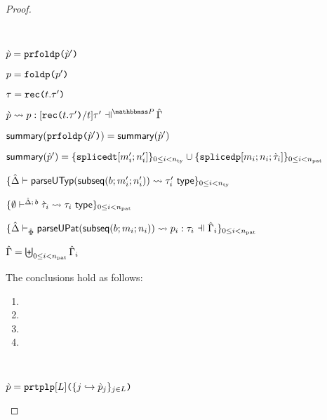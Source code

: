 \begin{grayparbox}
\begin{proof}
\begin{byCases}
    \resetpfcounter
  \item[\text{(\ref{rule:cvalidP-UP-fold})}] ~
    \begin{pfsteps*}
      \item $\grave{p}=\texttt{prfoldp}\texttt{(}\grave{p}'\texttt{)}$ 
      \item $p=\texttt{foldp}\texttt{(}p'\texttt{)}$ 
      \item $\tau=\texttt{rec}\texttt{(}t.\tau'\texttt{)}$ 
      \item $\cvalidP{\upctx}{\pscenev}{\cpv}{p}{[\arec{t}{\tau'}/t]\tau'}$  
      \item $\mathsf{summary}(\texttt{prfoldp}\texttt{(}\grave{p}'\texttt{)}) = \mathsf{summary}(\grave{p}')$  
      \item $\mathsf{summary}(\grave{p}') = \{\texttt{splicedt}[m'_i; n'_i]\}_{0 \leq i < n_\text{ty}} \cup \{\texttt{splicedp}[m_i; n_i; \grave{\tau}_i]\}_{0 \leq i < n_\text{pat}}$  
      \item $\{
            \hat{\Delta} \vdash 
              \mathsf{parseUTyp}(\mathsf{subseq}(b; m'_i; n'_i))
             \leadsto \tau'_i~\mathsf{type}
          \}_{0 \leq i < n_\text{ty}}$  
      \item $\{
        \emptyset\vdash^{
          \hat{\Delta};\,b
        } 
          \grave{\tau}_i
         \leadsto \tau_i~\mathsf{type}
      \}_{0 \leq i < n_\text{pat}}$  
      \item $\sseq{
        \patExpands
          {\upctx_i}
          {\uPhi}
          {\parseUPatF{\bsubseq{b}{m_i}{n_i}}}
          {p_i}
          {\tau_i}
      }{\npat}$  
    \item $\hat\Gamma = \biguplus_{0 \leq i < n_\text{pat}} \hat\Gamma_i$ \end{pfsteps*}
    The conclusions hold as follows:
    \begin{enumerate}
    \item {}
    \item {}
    \item {}
    \item {}
    \end{enumerate}
    \resetpfcounter
  \item[\text{(\ref{rule:cvalidP-UP-tpl})}] ~
    \begin{pfsteps*}
      \item $\grave{p}=\texttt{prtplp}[L]\texttt{(}\{j \hookrightarrow \grave{p}_{j}\}_{j \in L}\texttt{)}$ 

\end{pfsteps*}
\end{byCases}
\end{proof}
\end{grayparbox}
